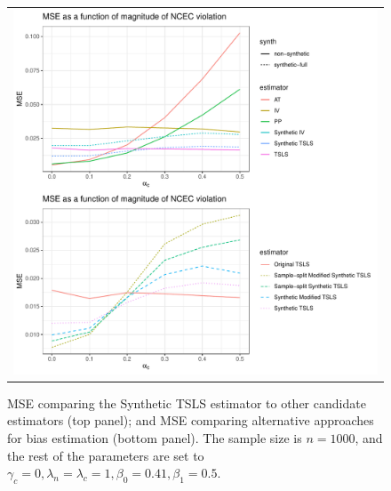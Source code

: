 \documentclass{article}
\begin{document}
\begin{figure}
\centering
\begin{tabular}{c}
\includegraphics[width =\textwidth]{figures/additional-mse-plot.pdf}
\end{tabular}\vspace{0.2in}
\caption{MSE comparing the Synthetic TSLS estimator to other candidate estimators (top panel); and MSE comparing alternative approaches for bias estimation (bottom panel). The sample size is $n = 1000$, and the rest of the parameters are set to $\gamma_c = 0, \lambda_n = \lambda_c = 1, \beta_0 = 0.41, \beta_1 = 0.5$.}\label{mse_plot_3}
\end{figure}



\end{document}
